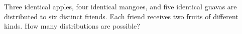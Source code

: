 Three identical apples, four identical mangoes, and five identical guavas are distributed to six distinct friends. Each friend receives two fruits of different kinds. How many distributions are possible?
